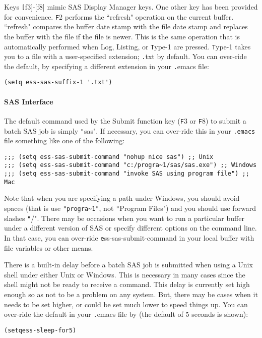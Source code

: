 \documentclass{article}
\newenvironment{Salltt}{\small\begin{alltt}}{\end{alltt}}
\begin{document}
Keys {\texttt [f3]-[f8]} mimic SAS Display Manager keys.  One other key has been
provided for convenience.  {\texttt F2} performs the ``refresh" operation on the
current buffer.  ``refresh" compares the buffer date stamp with the
file date stamp and replaces the buffer with the file if the file is
newer.  This is the same operation that is automatically performed
when Log, Listing, or {\texttt Type-1} are pressed.  {\texttt Type-1} takes you to a file
with a user-specified extension; {\texttt .txt} by default.  You can over-ride
the default, by specifying a different extension in your {\texttt .emacs} file:
\begin{verbatim}
(setq ess-sas-suffix-1 '.txt')
\end{verbatim}

\paragraph{SAS Interface}
\label{sec:SAS:interface}

The default command used by the Submit function key ({\texttt F3} or {\texttt F8}) to
submit a batch SAS job is simply {\texttt "sas"}.  If necessary, you can
over-ride this in your \verb+.emacs+ file something like one of the
following:
{\small
\begin{verbatim}
;;; (setq ess-sas-submit-command "nohup nice sas") ;; Unix
;;; (setq ess-sas-submit-command "c:/progra~1/sas/sas.exe") ;; Windows
;;; (setq ess-sas-submit-command "invoke SAS using program file") ;; Mac
\end{verbatim}
}
Note that when you are specifying a path under Windows, you should
avoid spaces (that is use {\verb+"progra~1"+}, not {\texttt "Program Files"}) and you
should use forward slashes {\texttt "/"}.  There may be occasions when you want
to run a particular buffer under a different version of SAS or specify
different options on the command line.  In that case, you can
over-ride {\texttt ess-sas-submit-command} in your local buffer with file
variables or other means.

There is a built-in delay before a batch SAS job is submitted when using
a Unix shell under either Unix or Windows.  This is necessary in many cases 
since the shell might not be ready to receive a command.  This delay is 
currently set high enough so as not to be a problem on any system.  But,
there may be cases when it needs to be set higher, or could be set much
lower to speed things up.  You can over-ride the default in your {\texttt .emacs}
file by (the default of 5 seconds is shown):
\begin{Salltt}
(setq ess-sleep-for 5)
\end{Salltt}
\end{document}
